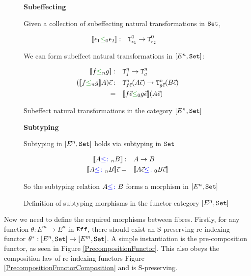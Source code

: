 \documentclass{Report}
\begin{document}
\begin{figure}
    \begin{framed}
        
        \centering\textbf{Subeffecting}


        Given a collection of subeffecting natural transformations in $\texttt{Set}$,
        
        \begin{align*}
            \deno{\e_1\subeffectz \e_2}:&\quad \Tz{\e_1}{} \rightarrow \Tz{\e_2}{}
        \end{align*}
        
        We can form subeffect natural transformations in $[E^n, \texttt{Set}]$:
        
        \begin{align*}
            \deno{f\subeffectn g}:&\quad\Tn{f}{}\rightarrow \Tn{g}{}\\
            (\deno{f\subeffectn g} A) \ev:&\quad\Tn{f\ev}{(A\ev)}\rightarrow \Tn{g\ev}{(B\ev)}\\
            =&\quad \deno{f\ev\subeffectz g\ev}(A\ev)
        \end{align*}
    \end{framed}
    \caption{Subeffect natural transformations in the category $[E^n, \texttt{Set}]$}
    \label{HowToBuildSubeffecting}
\end{figure}

\begin{figure}
    \begin{framed}
        
\centering\textbf{Subtyping}


Subtyping in $[E^n, \texttt{Set}]$ holds via subtyping in $\texttt{Set}$

\begin{align*}
    {\bf [\![}A{\color{blue} \leq\colon}_n B{\bf ]\!]}:&\quad A\rightarrow B\\
    {\bf [\![}A{\color{blue} \leq\colon}_n B{\bf ]\!]}\vec{\epsilon}=&\quad {\bf [\![}A\vec{\epsilon}{\color{blue} \leq\colon}_0 B\vec{\epsilon}{\bf ]\!]}
\end{align*}

So the subtyping relation $A {\color{blue} \leq\colon} B$ forms a morphism in $[E^n, \texttt{Set}]$

    \end{framed}
    \caption{Definition of subtyping morphisms in the functor category $[E^n, \texttt{Set}]$}
    \label{HowToBuildSubtyping}
\end{figure}

Now we need to define the required morphisms between fibres. Firstly, for any function $\theta: E^m \rightarrow E^n$ in $\texttt{Eff}$, there should exist an S-preserving re-indexing functor $\theta^*: [E^n, \texttt{Set}] \rightarrow [E^m, \texttt{Set}]$. A simple instantiation is the pre-composition functor, as seen in Figure \ref{PrecompositionFunctor}. This also obeys the composition law of re-indexing functors Figure \ref{PrecompositionFunctorComposition} and is S-preserving.
\end{document}
